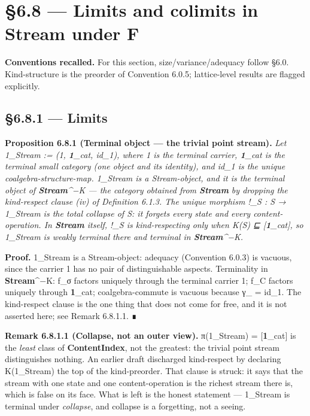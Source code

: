 \documentclass[11pt, openany]{book}
\newcommand{\sectionbreak}{\clearpage}
\begin{document}
\sectionbreak

\section{§6.8 --- Limits and colimits in Stream under F}

\textbf{Conventions recalled.} For this section, size/variance/adequacy follow §6.0. Kind-structure is the preorder of Convention 6.0.5; lattice-level results are flagged explicitly.

\subsection{§6.8.1 --- Limits}

\textbf{Proposition 6.8.1 (Terminal object --- the trivial point stream).} \textit{Let 1\_\allowbreak{}Stream := (1, \textbf{1}\_\allowbreak{}cat, id\_\allowbreak{}1), where 1 is the terminal carrier, \textbf{1}\_\allowbreak{}cat is the terminal small category (one object and its identity), and id\_\allowbreak{}1 is the unique coalgebra-structure-map. 1\_\allowbreak{}Stream is a Stream-object, and it is the terminal object of \textbf{Stream}\textasciicircum{}{−K} --- the category obtained from \textbf{Stream} by dropping the kind-respect clause (iv) of Definition 6.1.3. The unique morphism !\_\allowbreak{}S : S → 1\_\allowbreak{}Stream is the total collapse of S: it forgets every state and every content-operation. In \textbf{Stream} itself, !\_\allowbreak{}S is kind-respecting only when K(S) ⊑ [\textbf{1}\_\allowbreak{}cat], so 1\_\allowbreak{}Stream is weakly terminal there and terminal in \textbf{Stream}\textasciicircum{}{−K}.}

\textbf{Proof.} 1\_\allowbreak{}Stream is a Stream-object: adequacy (Convention 6.0.3) is vacuous, since the carrier 1 has no pair of distinguishable aspects. Terminality in \textbf{Stream}\textasciicircum{}{−K}: f\_\allowbreak{}σ factors uniquely through the terminal carrier 1; f\_\allowbreak{}C factors uniquely through \textbf{1}\_\allowbreak{}cat; coalgebra-commute is vacuous because γ\_ = id\_\allowbreak{}1. The kind-respect clause is the one thing that does not come for free, and it is not asserted here; see Remark 6.8.1.1. ∎

\textbf{Remark 6.8.1.1 (Collapse, not an outer view).} π(1\_\allowbreak{}Stream) = [\textbf{1}\_\allowbreak{}cat] is the \textit{least} class of \textbf{ContentIndex}, not the greatest: the trivial point stream distinguishes nothing. An earlier draft discharged kind-respect by declaring K(1\_\allowbreak{}Stream) the top of the kind-preorder. That clause is struck: it says that the stream with one state and one content-operation is the richest stream there is, which is false on its face. What is left is the honest statement --- 1\_\allowbreak{}Stream is terminal under \textit{collapse}, and collapse is a forgetting, not a seeing.
\end{document}
